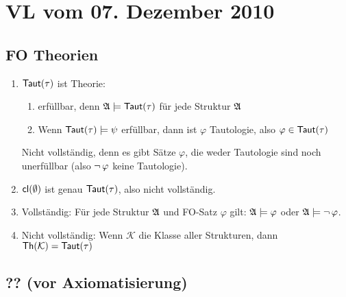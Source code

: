 \section{VL vom 07. Dezember 2010}

\subsection{FO Theorien}

\begin{enumerate}
  \item $\operatorname{\text{\textsf{Taut}}}(\tau)$ ist Theorie:
  \begin{enumerate}
    \item erfüllbar, denn $\mathfrak{A}\models\operatorname{\text{\textsf{Taut}}}(\tau)$ für jede Struktur $\mathfrak{A}$
    \item Wenn $\operatorname{\text{\textsf{Taut}}}(\tau)\models\psi$ erfüllbar, dann ist $\varphi$ Tautologie, also $\varphi\in\operatorname{\text{\textsf{Taut}}}(\tau)$
  \end{enumerate}
  
  Nicht vollständig, denn es gibt Sätze $\varphi$, die weder Tautologie sind noch unerfüllbar
  (also $\operatorname{\neg}\varphi$ keine Tautologie).
  
  \item $\operatorname{\text{\textsf{cl}}}(\emptyset)$ ist genau $\operatorname{\text{\textsf{Taut}}}(\tau)$, also nicht vollständig.
  
  \item Vollständig: Für jede Struktur $\mathfrak{A}$ und FO-Satz $\varphi$ gilt: $\mathfrak{A}\models\varphi$ oder $\mathfrak{A}\models\operatorname{\neg}\varphi$.
  
  \item Nicht vollständig: Wenn $\mathcal{K}$ die Klasse aller Strukturen, dann $\operatorname{\text{\textsf{Th}}}(\mathcal{K}) = \operatorname{\text{\textsf{Taut}}}(\tau)$
\end{enumerate}

\subsection{?? (vor Axiomatisierung)}

